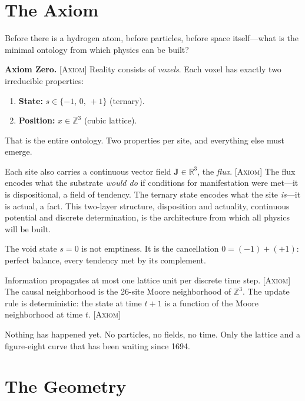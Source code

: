 \documentclass[12pt]{article}
\newcommand{\ZZ}{\mathbb{Z}}
\newcommand{\RR}{\mathbb{R}}
\newcommand{\etag}[1]{{\normalfont\textsc{\footnotesize [#1]}}}
\theoremstyle{compact}
\begin{document}
\section{The Axiom}
\label{sec:axiom}

Before there is a hydrogen atom, before particles, before space itself---what is the minimal ontology from which physics can be built?

\smallskip
\noindent\textbf{Axiom Zero.} \etag{Axiom} Reality consists of \emph{voxels}. Each voxel has exactly two irreducible properties:
\begin{enumerate}[nosep]
  \item \textbf{State:} $s \in \{-1,\, 0,\, +1\}$ \quad (ternary).
  \item \textbf{Position:} $x \in \ZZ^3$ \quad (cubic lattice).
\end{enumerate}
That is the entire ontology. Two properties per site, and everything else must emerge.

\smallskip

Each site also carries a continuous vector field $\mathbf{J} \in \RR^3$, the \emph{flux}. \etag{Axiom} The flux encodes what the substrate \emph{would do} if conditions for manifestation were met---it is dispositional, a field of tendency. The ternary state encodes what the site \emph{is}---it is actual, a fact. This two-layer structure, disposition and actuality, continuous potential and discrete determination, is the architecture from which all physics will be built.

The void state $s = 0$ is not emptiness. It is the cancellation $0 = (-1) + (+1)$: perfect balance, every tendency met by its complement.

Information propagates at most one lattice unit per discrete time step. \etag{Axiom} The causal neighborhood is the 26-site Moore neighborhood of $\ZZ^3$. The update rule is deterministic: the state at time $t+1$ is a function of the Moore neighborhood at time $t$. \etag{Axiom}

Nothing has happened yet. No particles, no fields, no time. Only the lattice and a figure-eight curve that has been waiting since 1694.


\section{The Geometry}
\label{sec:geometry}
\end{document}
